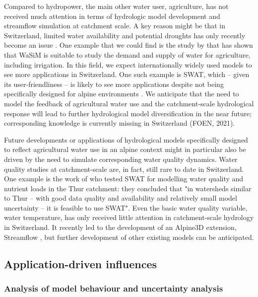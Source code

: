 \documentclass[10pt,a4paper]{article}
\begin{document}
Compared to hydropower, the main other water user, agriculture, has not received much attention in terms of hydrologic model development and streamflow simulation at catchment scale. A key reason might be that in Switzerland, limited water availability and potential droughts has only recently become an issue \citep{FOEN2021}. One example that we could find is the study by \citet{Fuhrer2012} that has shown that WaSiM is suitable to study the demand and supply of water for agriculture, including irrigation. In this field, we expect internationally widely used models to see more applications in Switzerland. One such example is SWAT, which -- given its user-friendliness \citep{Abbaspour2007} -- is likely to see more applications despite not being specifically designed for alpine environments \citep{Rahman2014, Andrianaki2019}. We anticipate that the need to model the feedback of agricultural water use and the catchment-scale hydrological response will lead to further hydrological model diversification in the near future; corresponding knowledge is currently missing in Switzerland (FOEN, 2021).

Future developments or applications of hydrological models specifically designed to reflect agricultural water use in an alpine context might in particular also be driven by the need to simulate corresponding water quality dynamics. Water quality studies at catchment-scale are, in fact, still rare to date in Switzerland. One example is the work of \citet{Abbaspour2007} who tested SWAT for modelling water quality and nutrient loads in the Thur catchment: they concluded that "in watersheds similar to Thur – with good data quality and availability and relatively small model uncertainty – it is feasible to use SWAT". Even the basic water quality variable, water temperature, has only received little attention in catchment-scale hydrology in Switzerland. It recently led to the development of an Alpine3D extension, Streamflow \citep{Gallice2016, Michel2021}, but further development of other existing models can be anticipated.


\subsection{Application-driven influences}
\label{sec:context:application}


\subsubsection{Analysis of model behaviour and uncertainty analysis}
\label{sec:context:uncertainty}
\end{document}
